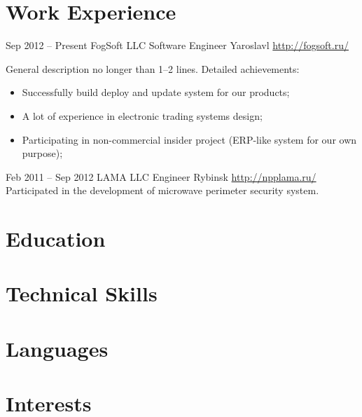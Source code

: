 \documentclass[11pt,a4paper,sans]{moderncv}
\begin{document}
\makecvtitle
\section{Work Experience}
\cventry
  {Sep 2012 -- Present}
  {FogSoft LLC}
  {Software Engineer}
  {Yaroslavl}
  {\newline{}\url{http://fogsoft.ru/}}
  {General description no longer than 1--2 lines.\newline{}%
Detailed achievements:%
\begin{itemize}%
\item Successfully build deploy and update system for our products;
\item A lot of experience in electronic trading systems design;
\item Participating in non-commercial insider project (ERP-like system for our own purpose);
\end{itemize}}
\cventry
  {Feb 2011 -- Sep 2012}
  {LAMA LLC}
  {Engineer}
  {Rybinsk}
  {\newline{}\url{http://npplama.ru/}}
  {Participated in the development of microwave perimeter security system.}
  
\section{Education}

\section{Technical Skills}

\section{Languages}

\section{Interests}
\end{document}
